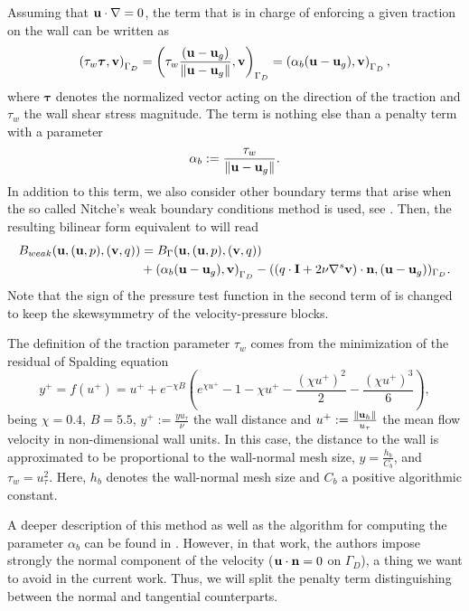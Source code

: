 Assuming that $ {\bf u}\cdot\nabla=0 $, the term that is in charge of enforcing a given traction on the wall can be written as
\begin{equation}
\label{eq-C7_wall_term}
\left(\tau_w\boldsymbol{\tau},{\bf v}\right)_{\Gamma_D}=\left(\tau_w\frac{({\bf u}-{\bf u}_g)}{\|{\bf u}-{\bf u}_g\|},{\bf v}\right)_{\Gamma_D}=\left(\alpha_b({\bf u}-{\bf u}_g),{\bf v}\right)_{\Gamma_D},
\end{equation}
where $ \boldsymbol{\tau} $ denotes the normalized vector acting on the direction of the traction and $ \tau_w $ the wall shear stress magnitude. The term  is nothing else than a penalty term with a parameter \begin{equation}
\label{eq-C7_alpha_b}
\alpha_b:=\frac{\tau_w}{\|{\bf u}-{\bf u}_g\|}.
\end{equation}
In addition to this term, we also consider other boundary terms that arise when the so called Nitche's weak boundary conditions method is used, see \cite{nitsche_uber_1971,stenberg_techniques_1995}. Then, the resulting bilinear form equivalent to  will read
\begin{align}
\label{eq-C7_bilinear_weak}
B_{weak}({\bf u},({\bf u},p),({\bf v},q))&=B_\Gamma({\bf u},({\bf u},p),({\bf v},q))\\\nonumber
&+\left(\alpha_b({\bf u}-{\bf u}_g),{\bf v}\right)_{\Gamma_D}-((q\cdot\mathbf{I}+2\nu\nabla^s{\bf v})\cdot{\bf n},({\bf u}-{\bf u}_g))_{\Gamma_D}.
\end{align}
Note that the sign of the pressure test function in the second term of  is changed to keep the skewsymmetry of the velocity-pressure blocks. 

The definition of the traction parameter $ \tau_w $ comes from the minimization of the residual of Spalding equation
\begin{equation}
\label{eq-C7_spalding}
y^+=f(u^+)=u^++e^{-\chi B}\left(e^{\chi u^+}-1-\chi u^+-\frac{\left(\chi u^+\right)^2}{2}-\frac{\left(\chi u^+\right)^3}{6}\right),
\end{equation}
being $ \chi=0.4 $, $ B=5.5 $, $ y^+:=\frac{yu_\tau}{\nu} $ the wall distance and $ u^+:=\frac{\|{\bf u}_h\|}{u_\tau} $ the mean flow velocity in non-dimensional wall units. In this case, the distance to the wall is approximated to be proportional to the wall-normal mesh size, $ y=\frac{h_b}{C_b} $, and $ \tau_w=u_\tau^2 $. Here, $ h_b $ denotes the wall-normal mesh size and $ C_b $ a positive algorithmic constant.

A deeper description of this method as well as the algorithm for computing the parameter $\alpha_b$ can be found in \cite{bazilevs_weak_2007}. However, in that work, the authors impose strongly the normal component of the velocity ($ {\bf u}\cdot{\bf n}=0 $ on $ \Gamma_D $), a thing we want to avoid in the current work. Thus, we will split the penalty term distinguishing between the normal and tangential counterparts. 

